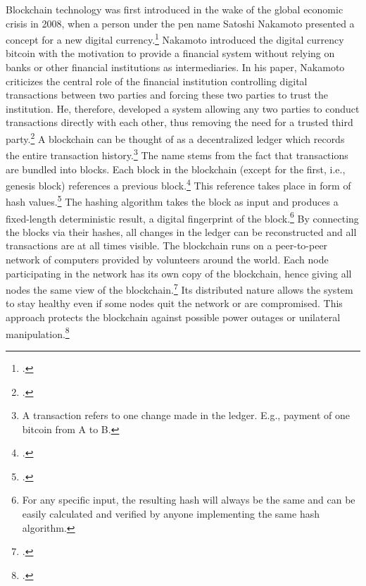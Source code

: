 Blockchain technology was first introduced in the wake of the global economic crisis in 2008, when a person under the pen name Satoshi Nakamoto presented a concept for a new digital currency.\footcite[Cf.][]{Nakamoto.2008} Nakamoto introduced the digital currency bitcoin with the motivation to provide a financial system without relying on banks or other financial institutions as intermediaries. In his paper, Nakamoto criticizes the central role of the financial institution controlling digital transactions between two parties and forcing these two parties to trust the institution. He, therefore, developed a system allowing any two parties to conduct transactions directly with each other, thus removing the need for a trusted third party.\footcite[Cf.][p.2]{Nakamoto.2008} A blockchain can be thought of as a decentralized ledger which records the entire transaction history.\footnote{A transaction refers to one change made in the ledger. E.g., payment of one bitcoin from A to B.} The name stems from the fact that transactions are bundled into blocks. Each block in the blockchain (except for the first, i.e., genesis block) references a previous block.\footcite[Cf.][chapter 1]{BashirMasteringBlockchain2017} This reference takes place in form of hash values.\footcite[Cf.][p.351]{AntonopolousAndreasM..2017} The hashing algorithm takes the block as input and produces a fixed-length deterministic result, a digital fingerprint of the block.\footnote{For any specific input, the resulting hash will always be the same and can be easily calculated and verified by anyone implementing the same hash algorithm.} By connecting the blocks via their hashes, all changes in the ledger can be reconstructed and all transactions are at all times visible. The blockchain runs on a peer-to-peer network of computers provided by volunteers around the world. Each node participating in the network has its own copy of the blockchain, hence giving all nodes the same view of the blockchain.\footcites[Cf.][p.5]{Tapscott.2017}[cf.][p.41]{Welzel.2017} Its distributed nature allows the system to stay healthy even if some nodes quit the network or are compromised. This approach protects the blockchain against possible power outages or unilateral manipulation.\footcite[Cf.][p.8]{Nakamoto.2008}

